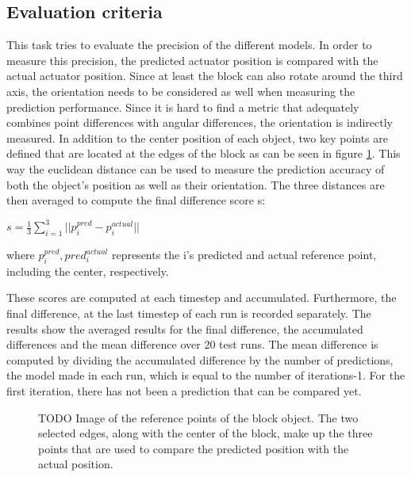 \subsection{Evaluation criteria}

This task tries to evaluate the precision of the different models. In order to measure this precision, the predicted actuator position
is compared with the actual actuator position. Since at least the block can also rotate around the third axis, the orientation needs to be
considered as well when measuring the prediction performance. Since it is hard to find a metric that adequately combines point differences with
angular differences, the orientation is indirectly measured. In addition to the center position of each object, two key points are defined that
are located at the edges of the block as can be seen in figure \ref{fig:refPoints}. This way the euclidean distance can be used to measure the
prediction accuracy of both the object's position as well as their orientation. The three distances are then averaged to compute the final difference
score s:

\begin{math}
	s = \frac{1}{3} \sum\limits_{i=1}^{3}||p^{pred}_i-p^{actual}_i||
\end{math}

where $p^{pred}_i, pred^{actual}_i$ represents the i's predicted and actual reference point, including the center, respectively.

These scores are computed at each timestep and accumulated. Furthermore, the final difference, at the last timestep of each run is recorded separately.
The results show the averaged results for the final difference, the accumulated differences and the mean difference over 20 test runs. The mean difference
is computed by dividing the accumulated difference by the number of predictions, the model made in each run, which is equal to the number of iterations-1. For the
first iteration, there has not been a prediction that can be compared yet.

\begin{figure}
	
	\caption{TODO Image of the reference points of the block object. The two selected edges, along with the center of the block, make up the three points that are used
		to compare the predicted position with the actual position.}
	\label{fig:refPoints}
\end{figure}


